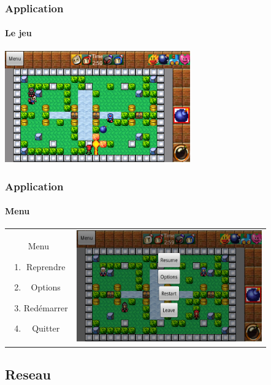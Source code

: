 		\begin{frame}
	\frametitle{Application}
	\framesubtitle{Le jeu}	
		\begin{center}
			\includegraphics[width=8cm]{img/game.png}
		\end{center}		
	
	\end{frame}
	
	\begin{frame}
	\frametitle{Application}
	\framesubtitle{Menu}
	
			\begin{tabular}{cc}
			\begin{minipage}{3cm}
				Menu
				\begin{enumerate}
					\item Reprendre
					\item Options
					\item Redémarrer
					\item Quitter
				\end{enumerate}
			\end{minipage} &
			\begin{minipage}{8cm}
				\includegraphics[width=8cm]{img/menusolo.png} 
			\end{minipage}\\
		\end{tabular}
	
	\end{frame}

\subsection{Reseau}

